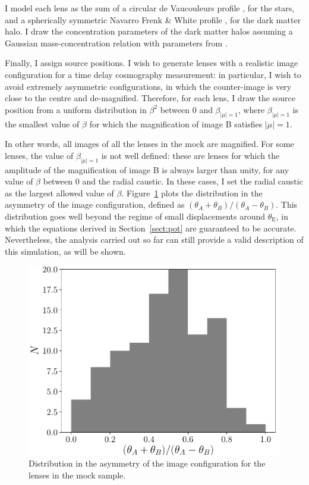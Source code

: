 \documentclass[usenatbib]{mnras}
\def\tein{\theta_{\mathrm{E}}}
\def\betamu{\beta_{|\mu|=1}}
\def\Sref#1{Section~\ref{#1}\xspace}
\def\Fref#1{Figure~\ref{#1}\xspace}
\begin{document}
I model each lens as the sum of a circular de Vaucouleurs profile \citep{deV48}, for the stars, and a spherically symmetric Navarro Frenk \& White profile \citep[NFW][]{NFW97}, for the dark matter halo.
I draw the concentration parameters of the dark matter halos assuming a Gaussian mass-concentration relation with parameters from \citet{Mac++08}.

Finally, I assign source positions.
I wish to generate lenses with a realistic image configuration for a time delay cosmography measurement: in particular, I wish to avoid extremely asymmetric configurations, in which the counter-image is very close to the centre and de-magnified.
Therefore, for each lens, I draw the source position from a uniform distribution in $\beta^2$ between 0 and $\betamu$, where $\betamu$ is the smallest value of $\beta$ for which the magnification of image B satisfies $|\mu|=1$. 

In other words, all images of all the lenses in the mock are magnified.
For some lenses, the value of $\betamu$ is not well defined: these are lenses for which the amplitude of the magnification of image B is always larger than unity, for any value of $\beta$ between 0 and the radial caustic. In these cases, I set the radial caustic as the largest allowed value of $\beta$.
\Fref{fig:asymm} plots the distribution in the asymmetry of the image configuration, defined as $(\theta_A + \theta_B)/(\theta_A - \theta_B)$.
This distribution goes well beyond the regime of small displacements around $\tein$, in which the equations derived in \Sref{sect:pot} are guaranteed to be accurate.
Nevertheless, the analysis carried out so far can still provide a valid description of this simulation, as will be shown.
%
\begin{figure}
 \includegraphics[width=\columnwidth]{asymm_hist-eps-converted-to.pdf}
 \caption{Distribution in the asymmetry of the image configuration for the lenses in the mock sample.}
 \label{fig:asymm}
\end{figure}
%
\end{document}
